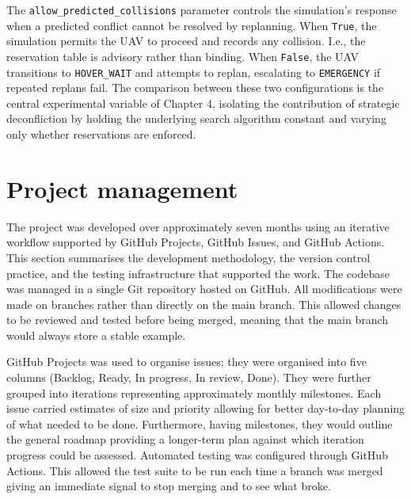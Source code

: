 \vspace{1em}

The \texttt{allow\_predicted\_collisions} parameter controls the simulation's response when a predicted conflict cannot be resolved by replanning. When \texttt{True}, the simulation permits the UAV to proceed and records any collision. I.e., the reservation table is advisory rather than binding. When \texttt{False}, the UAV transitions to \texttt{HOVER\_WAIT} and attempts to replan, escalating to \texttt{EMERGENCY} if repeated replans fail. The comparison between these two configurations is the central experimental variable of Chapter 4, isolating the contribution of strategic deconfliction by holding the underlying search algorithm constant and varying only whether reservations are enforced.\par

\vspace{1em}

\section{Project management}

The project was developed over approximately seven months using an iterative workflow supported by GitHub Projects, GitHub Issues, and GitHub Actions. This section summarises the development methodology, the version control practice, and the testing infrastructure that supported the work. The codebase was managed in a single Git repository hosted on GitHub. All modifications were made on branches rather than directly on the main branch. This allowed changes to be reviewed and tested before being merged, meaning that the main branch would always store a stable example. \par

\vspace{1em}

GitHub Projects was used to organise issues; they were organised into five columns (Backlog, Ready, In progress, In review, Done). They were further grouped into iterations representing approximately monthly milestones. Each issue carried estimates of size and priority allowing for better day-to-day planning of what needed to be done. Furthermore, having milestones, they would outline the general roadmap providing a longer-term plan against which iteration progress could be assessed. Automated testing was configured through GitHub Actions. This allowed the test suite to be run each time a branch was merged giving an immediate signal to stop merging and to see what broke.\par

\vspace{1em}